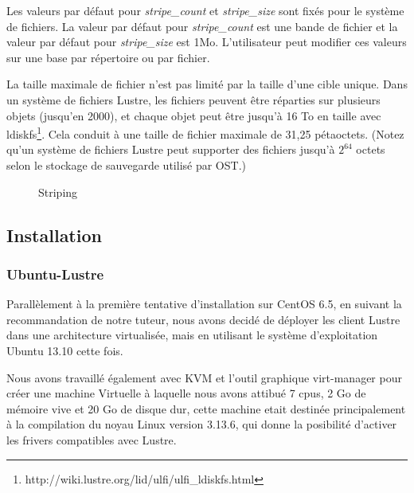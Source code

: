 \documentclass[12pt]{article}
\begin{document}
Les valeurs par défaut pour \textit{stripe\_count} et \textit{stripe\_size} sont fixés pour le système de fichiers. La valeur par défaut pour \textit{stripe\_count} est une bande de fichier et la valeur par défaut pour \textit{stripe\_size} est 1Mo. L'utilisateur peut modifier ces valeurs sur une base par répertoire ou par fichier.

La taille maximale de fichier n'est pas limité par la taille d'une cible unique. Dans un système de fichiers Lustre, les fichiers peuvent être réparties sur plusieurs objets (jusqu'en 2000), et chaque objet peut être jusqu'à 16 To en taille avec ldiskfs\footnote{http://wiki.lustre.org/lid/ulfi/ulfi\_ldiskfs.html}. Cela conduit à une taille de fichier maximale de 31,25 pétaoctets. (Notez qu'un système de fichiers Lustre peut supporter des fichiers jusqu'à \begin{math}2^{64}\end{math} octets selon le stockage de sauvegarde utilisé par OST.)

\begin{figure}[Striping]
\caption{Striping}
\label{fig:identification}
\end{figure}


\newpage
\subsection{Installation}
\newpage
\subsubsection{Ubuntu-Lustre}
Parallèlement à la première tentative d'installation sur CentOS 6.5, en suivant la recommandation de notre tuteur, nous avons decidé de déployer les client Lustre dans une architecture virtualisée, mais en utilisant le système d'exploitation Ubuntu 13.10 cette fois.

Nous avons travaillé également avec KVM et l'outil graphique virt-manager pour créer une machine Virtuelle à laquelle nous avons attibué 7 cpus, 2 Go de mémoire vive et 20 Go de disque dur, cette machine etait destinée principalement à la compilation du noyau Linux version 3.13.6, qui donne la posibilité d'activer les frivers compatibles avec Lustre.
\end{document}
